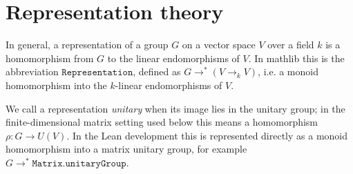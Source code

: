 \section{Representation theory}



In general, a representation of a group \(G\) on a vector space \(V\) over a
field \(k\) is a homomorphism from \(G\) to the linear endomorphisms of \(V\).
In mathlib this is the abbreviation \(\texttt{Representation}\), defined as
\(G \to^* (V \to_{\!k} V)\), i.e. a monoid homomorphism into the \(k\)-linear
endomorphisms of \(V\).

We call a representation \emph{unitary} when its image lies in the unitary
group; in the finite-dimensional matrix setting used below this means a
homomorphism \(\rho : G \to U(V)\). In the Lean development this is represented
directly as a monoid homomorphism into a matrix unitary group, for example
\(G \to^* \texttt{Matrix.unitaryGroup}\).




